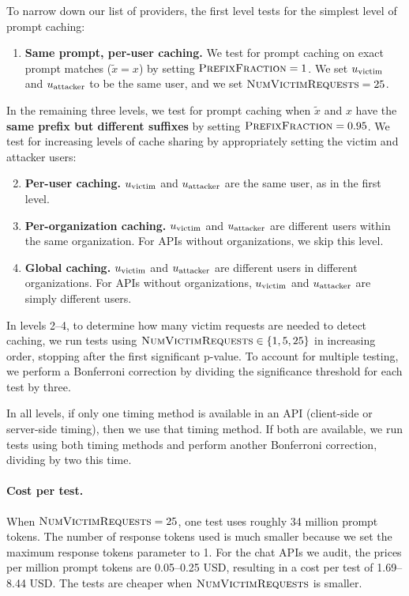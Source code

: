 To narrow down our list of providers, the first level tests for the simplest level of prompt caching:
\begin{enumerate}
    \item \textbf{Same prompt, per-user caching.} We test for prompt caching on exact prompt matches ($\tilde{x} = x$) by setting $\textsc{PrefixFraction} = 1$. We set $u_\text{victim}$ and $u_\text{attacker}$ to be the same user, and we set $\textsc{NumVictimRequests}{} = 25$.
\end{enumerate}
In the remaining three levels, we test for prompt caching when $\tilde{x}$ and $x$ have the \textbf{same prefix but different suffixes} by setting $\textsc{PrefixFraction} = 0.95$. We test for increasing levels of cache sharing by appropriately setting the victim and attacker users:
\begin{enumerate}
    \setcounter{enumi}{1}
    \item \textbf{Per-user caching.} $u_\text{victim}$ and $u_\text{attacker}$ are the same user, as in the first level.
    \item \textbf{Per-organization caching.} $u_\text{victim}$ and $u_\text{attacker}$ are different users within the same organization. For APIs without organizations, we skip this level.
    \item \textbf{Global caching.} $u_\text{victim}$ and $u_\text{attacker}$ are different users in different organizations. For APIs without organizations, $u_\text{victim}$ and $u_\text{attacker}$ are simply different users.
\end{enumerate}
In levels 2--4, to determine how many victim requests are needed to detect caching, we run tests using $\textsc{NumVictimRequests}{} \in \{1, 5, 25\}$ in increasing order, stopping after the first significant p-value. To account for multiple testing, we perform a Bonferroni correction by dividing the significance threshold for each test by three.

In all levels, if only one timing method is available in an API (client-side or server-side timing), then we use that timing method. If both are available, we run tests using both timing methods and perform another Bonferroni correction, dividing by two this time.


\paragraph{Cost per test.}
When $\textsc{NumVictimRequests}{} = 25$, one test uses roughly 34 million prompt tokens. The number of response tokens used is much smaller because we set the maximum response tokens parameter to 1. For the chat APIs we audit, the prices per million prompt tokens are 0.05--0.25 USD, resulting in a cost per test of 1.69--8.44 USD. The tests are cheaper when $\textsc{NumVictimRequests}{}$ is smaller.


